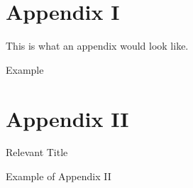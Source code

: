 
\section{Appendix I} \label{app1}
\begin{frame}
    \begin{remark}
    This is what an appendix would look like.
    \end{remark}
    \begin{exampleblock}{Example}
    {\gray \lipsum[2][1-20]}
    \end{exampleblock}
\end{frame}

\section{Appendix II} \label{app2}
\begin{frame}
    \begin{block}{Relevant Title}
    {\gray \lipsum[2][1]}
    \end{block}
    \begin{exampleblock}{Example of Appendix II}
    {\gray \lipsum[4][1-20]}
    \end{exampleblock}
\end{frame}